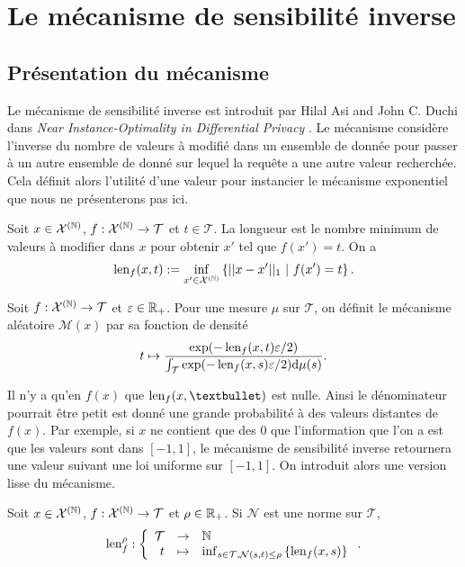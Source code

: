 \section{Le mécanisme de sensibilité inverse}

\subsection{Présentation du mécanisme}

Le mécanisme de sensibilité inverse est introduit par {\sc Hilal Asi} and {\sc John C. Duchi} dans \textit{Near Instance-Optimality in Differential Privacy} \cite{Asi2020NearII}. Le mécanisme considère l'inverse du nombre de valeurs à modifié dans un ensemble de donnée pour passer à un autre ensemble de donné sur lequel la requête a une autre valeur recherchée. Cela définit alors l'utilité d'une valeur pour instancier le mécanisme exponentiel \cite{mcsherry2007mechanism} que nous ne présenterons pas ici.

\begin{definition}[Longueur]
    Soit \(x \in \mathcal X^{(\mathbb{N})}\), \(f : \mathcal X^{(\mathbb{N})} \to \mathcal T\) et \(t \in \mathcal T\). La longueur est le nombre minimum de valeurs à modifier dans \(x\) pour obtenir \(x'\) tel que \(f(x') = t\). On a 
    \[
        \operatorname{len}_f(x,t) := \inf_{x' \in \mathcal X^{(\mathbb{N})}}\left\{|| x - x'||_1 \ |\ f(x') = t \right\}.
    \]
\end{definition}

\begin{definition}
    Soit \(f : \mathcal X^{(\mathbb{N})} \to \mathcal T\) et \(\varepsilon \in \mathbb{R}_+\). Pour une mesure \(\mu\) sur \(\mathcal T\), on définit le mécanisme aléatoire \(\mathcal M(x)\) par sa fonction de densité 
    \[
        t \mapsto \dfrac{\exp(-\operatorname{len}_f(x, t)\varepsilon/2)}{\int_\mathcal T \exp(-\operatorname{len}_f(x, s)\varepsilon/2)\mathrm{d} \mu(s)}.
    \] 
\end{definition}

Il n'y a qu'en \(f(x)\) que \(\len_f(x,•)\) est nulle. Ainsi le dénominateur pourrait être petit est donné une grande probabilité à des valeurs distantes de \(f(x)\). Par exemple, si \(x\) ne contient que des \(0\) que l'information que l'on a est que les valeurs sont dans \([-1,1]\), le mécanisme de sensibilité inverse retournera une valeur suivant une loi uniforme sur \([-1, 1]\). On \cite{mcsherry2007mechanism} introduit alors une version lisse du mécanisme.


\begin{definition}
    Soit \(x \in \mathcal X^{(\mathbb{N})}\), \(f : \mathcal X^{(\mathbb{N})} \to \mathcal T\) et \(\rho \in \mathbb{R}_+\). Si \(\mathcal N\) est une norme sur \(\mathcal T\),
    \[
        \len_f^{\rho} : 
        \left\{
            \begin{array}[]{rcl}
                \mathcal T & \to & \N\\
                t & \mapsto & \inf_{s \in \mathcal T, \mathcal N(s,t) \leq \rho}\left\{\len_f(x,s) \right\}  
            \end{array}
        \right. .   
    \]
\end{definition}

